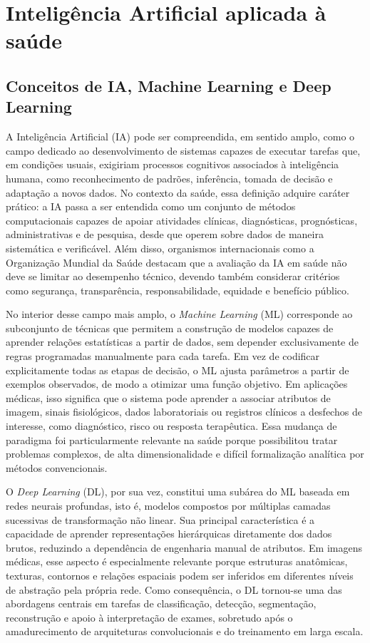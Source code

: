 \documentclass[tcc,capa]{texufpel}
\begin{document}
\section{Inteligência Artificial aplicada à saúde}

\subsection{Conceitos de IA, Machine Learning e Deep Learning}

A Inteligência Artificial (IA) pode ser compreendida, em sentido amplo, como o campo dedicado ao desenvolvimento de sistemas capazes de executar tarefas que, em condições usuais, exigiriam processos cognitivos associados à inteligência humana, como reconhecimento de padrões, inferência, tomada de decisão e adaptação a novos dados. No contexto da saúde, essa definição adquire caráter prático: a IA passa a ser entendida como um conjunto de métodos computacionais capazes de apoiar atividades clínicas, diagnósticas, prognósticas, administrativas e de pesquisa, desde que operem sobre dados de maneira sistemática e verificável. Além disso, organismos internacionais como a Organização Mundial da Saúde destacam que a avaliação da IA em saúde não deve se limitar ao desempenho técnico, devendo também considerar critérios como segurança, transparência, responsabilidade, equidade e benefício público. \cite{WHO2021AI,Yu2018AIHealthcare}

No interior desse campo mais amplo, o \textit{Machine Learning} (ML) corresponde ao subconjunto de técnicas que permitem a construção de modelos capazes de aprender relações estatísticas a partir de dados, sem depender exclusivamente de regras programadas manualmente para cada tarefa. Em vez de codificar explicitamente todas as etapas de decisão, o ML ajusta parâmetros a partir de exemplos observados, de modo a otimizar uma função objetivo. Em aplicações médicas, isso significa que o sistema pode aprender a associar atributos de imagem, sinais fisiológicos, dados laboratoriais ou registros clínicos a desfechos de interesse, como diagnóstico, risco ou resposta terapêutica. Essa mudança de paradigma foi particularmente relevante na saúde porque possibilitou tratar problemas complexos, de alta dimensionalidade e difícil formalização analítica por métodos convencionais. \cite{Rajkomar2019,Esteva2019DLHealthcare}

O \textit{Deep Learning} (DL), por sua vez, constitui uma subárea do ML baseada em redes neurais profundas, isto é, modelos compostos por múltiplas camadas sucessivas de transformação não linear. Sua principal característica é a capacidade de aprender representações hierárquicas diretamente dos dados brutos, reduzindo a dependência de engenharia manual de atributos. Em imagens médicas, esse aspecto é especialmente relevante porque estruturas anatômicas, texturas, contornos e relações espaciais podem ser inferidos em diferentes níveis de abstração pela própria rede. Como consequência, o DL tornou-se uma das abordagens centrais em tarefas de classificação, detecção, segmentação, reconstrução e apoio à interpretação de exames, sobretudo após o amadurecimento de arquiteturas convolucionais e do treinamento em larga escala. \cite{Lee2017DLMedicalImaging,Esteva2021MedCV,Esteva2019DLHealthcare}
\end{document}
